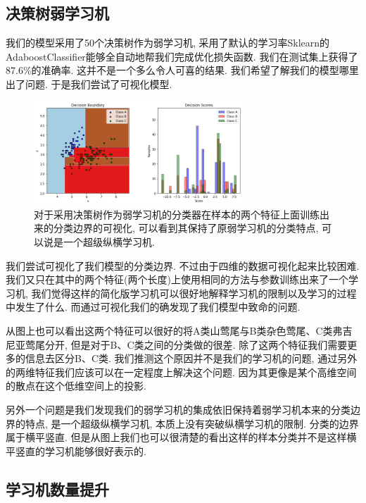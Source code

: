 \documentclass[lang=cn,11pt]{elegantpaper}
\begin{document}
\subsection{决策树弱学习机}

我们的模型采用了50个决策树作为弱学习机, 采用了默认的学习率Sklearn的AdaboostClassifier能够全自动地帮我们完成优化损失函数. 我们在测试集上获得了87.6\%的准确率. 这并不是一个多么令人可喜的结果. 我们希望了解我们的模型哪里出了问题. 于是我们尝试了可视化模型.

\begin{figure}[htbp]
  \centering
    \includegraphics[width=0.7\textwidth]{ada_tree}
    \caption{对于采用决策树作为弱学习机的分类器在样本的两个特征上面训练出来的分类边界的可视化, 可以看到其保持了原弱学习机的分类特点, 可以说是一个超级纵横学习机.}
  \end{figure}
我们尝试可视化了我们模型的分类边界. 不过由于四维的数据可视化起来比较困难. 我们又只在其中的两个特征(两个长度)上使用相同的方法与参数训练出来了一个学习机, 我们觉得这样的简化版学习机可以很好地解释学习机的限制以及学习的过程中发生了什么. 而通过可视化我们的确发现了我们模型中致命的问题.


从图上也可以看出这两个特征可以很好的将A类山莺尾与B类杂色莺尾、C类弗吉尼亚莺尾分开, 但是对于B、C类之间的分类做的很差. 除了这两个特征我们需要更多的信息去区分B、C类. 我们推测这个原因并不是我们的学习机的问题, 通过另外的两维特征我们应该可以在一定程度上解决这个问题. 因为其更像是某个高维空间的散点在这个低维空间上的投影.

另外一个问题是我们发现我们的弱学习机的集成依旧保持着弱学习机本来的分类边界的特点, 是一个超级纵横学习机, 本质上没有突破纵横学习机的限制. 分类的边界属于横平竖直. 但是从图上我们也可以很清楚的看出这样的样本分类并不是这样横平竖直的学习机能够很好表示的.





\subsection{学习机数量提升}
\end{document}
